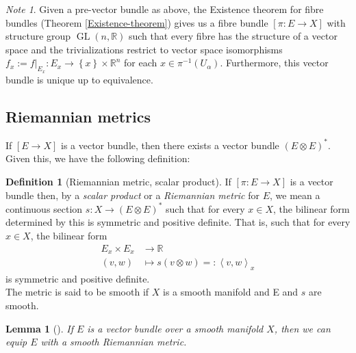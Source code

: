 \documentclass[reqno]{amsart}
\newtheorem{lemma}[theorem]{Lemma}
\theoremstyle{definition}
\newtheorem{definition}[theorem]{Definition}
\theoremstyle{remark}
\newtheorem*{note}{Note}
\DeclareMathOperator{\GL}{GL}
\begin{document}
    \begin{note}
        Given a pre-vector bundle as above, the Existence theorem
        for fibre bundles (Theorem \ref{Existence-theorem})
        gives us a fibre bundle
        $\left[ \pi \colon E \to X \right] $ with
        structure group
        $\GL \left( n, \mathbb{R} \right) $ such that
        every fibre has the structure of a vector space
        and the trivializations restrict to
        vector space isomorphisms
        $f_x := f|_{E_x} \colon
        E_x \to \left\{ x \right\} \times \mathbb{R}^{n}$ 
        for each $x \in 
        \pi^{-1}\left( U_{\alpha} \right) $.
        Furthermore, this vector bundle is unique
        up to equivalence.
    \end{note}

    \subsection{Riemannian metrics}

    If $\left[ E \to X \right] $ is a vector bundle, then
    there exists a vector bundle
    $\left( E \otimes E \right)^{*}$. Given this, we have
    the following definition:
    \begin{definition}[Riemannian metric, scalar product]
        If $\left[ \pi \colon E \to X \right] $ is
        a vector bundle then, by a \textit{scalar product} or
        a \textit{Riemannian metric} for $E$, we 
        mean a continuous section
        $s \colon X \to \left( E \otimes E \right)^{*}$ 
        such that for every $x \in X$, the
        bilinear form determined by
        this is symmetric and positive definite. That is,
        such that for every $x \in X$, the bilinear form
        \begin{align*}
            E_x \times E_x &\to \mathbb{R}\\
            \left( v,w \right) &\mapsto 
            s \left( v \otimes w \right) 
            =: \left<v,w \right>_x
        \end{align*}
        is symmetric and positive definite.\\
        The metric is said to be smooth if
        $X$ is a smooth manifold and
        E and $s$ are smooth.
    \end{definition}

    \begin{lemma}[]
        If $E$ is a vector bundle over a smooth manifold
        $X$, then
        we can equip $E$ with a smooth Riemannian metric.
    \end{lemma}
\end{document}
